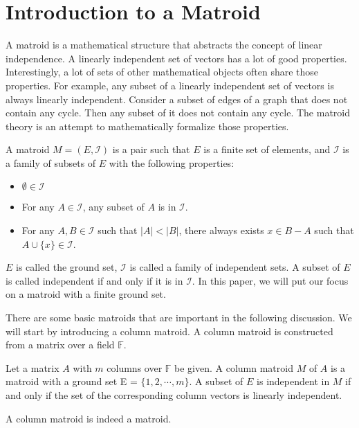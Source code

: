 \section{Introduction to a Matroid}

A matroid is a mathematical structure that abstracts the concept of linear independence.
A linearly independent set of vectors has a lot of good properties.
Interestingly, a lot of sets of other mathematical objects often share those properties.
For example, any subset of a linearly independent set of vectors is always linearly independent.
Consider a subset of edges of a graph that does not contain any cycle.
Then any subset of it does not contain any cycle.
The matroid theory is an attempt to mathematically formalize those properties.

\begin{defn}
A matroid $M = (E, \mathcal{I})$ is a pair such that $E$ is a finite set of elements, and $\mathcal{I}$ is a family of subsets of $E$ with the following properties:
\begin{itemize}
\item $\emptyset \in \mathcal{I}$
\item For any $A\in \mathcal{I}$, any subset of $A$ is in $\mathcal{I}$.
\item For any $A, B \in \mathcal{I}$ such that $\lvert A \rvert < \lvert B \rvert$, there always exists $x \in B - A$ such that $A \cup \{ x \} \in \mathcal{I}$.
\end{itemize}
\end{defn}
$E$ is called the ground set, $\mathcal{I}$ is called a family of independent sets. A subset of $E$ is called independent if and only if it is in $\mathcal{I}$.
In this paper, we will put our focus on a matroid with a finite ground set. 


There are some basic matroids that are important in the following discussion.
We will start by introducing a column matroid. 
A column matroid is constructed from a matrix over a field $\mathbb{F}$.

\begin{defn}
Let a matrix $A$ with $m$ columns over $\mathbb{F}$ be given.
A column matroid $M$ of $A$ is a matroid with a ground set E = $\{ 1, 2, \cdots, m \}$.
A subset of $E$ is independent in $M$ if and only if the set of the corresponding column vectors is linearly independent.
\end{defn}

\begin{thm}
A column matroid is indeed a matroid.
\end{thm}

